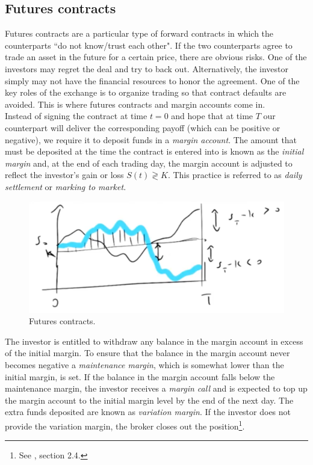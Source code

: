 \subsection{Futures contracts}
Futures contracts are a particular type of forward contracts in which the counterparts ``do not know/trust each other". If the two counterparts agree to trade an asset in the future for a certain price, there are obvious risks. One of the investors may regret the deal and try to back out. Alternatively, the investor simply may not have the financial resources to honor the agreement. One of the key roles of the exchange is to organize trading so that contract defaults are avoided. This is where futures contracts and margin accounts come in.\\
Instead of signing the contract at time $t=0$ and hope that at time $T$ our counterpart will deliver the corresponding payoff (which can be positive or negative), we require it to deposit funds in a \emph{margin account}. The amount that must be deposited at the time the contract is entered into is known as the \emph{initial margin} and, at the end of each trading day, the margin account is adjusted to reflect the investor's gain or loss $S(t)\gtrless K$. This practice is referred to as \emph{daily settlement} or \emph{marking to market}.
\begin{figure}[ht]
    \centering
    \includegraphics[scale=0.27]{fig/tmp/fig31.png}
    \caption{Futures contracts.}
    \label{fig:futures}
\end{figure}
\newline The investor is entitled to withdraw any balance in the margin account in excess of the initial margin. To ensure that the balance in the margin account never becomes negative a \emph{maintenance margin}, which is somewhat lower than the initial margin, is set. If the balance in the margin account falls below the maintenance margin, the investor receives a \emph{margin call} and is expected to top up the margin account to the initial margin level by the end of the next day. The extra funds deposited are known as \emph{variation margin}. If the investor does not provide the variation margin, the broker closes out the position\footnote{See \cite{hull}, section 2.4.}.\\

